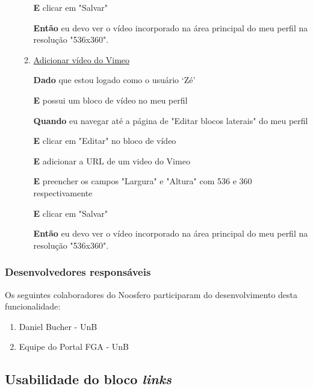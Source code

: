 \begin{enumerate}
\begin{enumerate}
\textbf{E} clicar em "Salvar"

\textbf{Então} eu devo ver o vídeo incorporado na área principal do meu
perfil na resolução "536x360".



\item \underline{Adicionar vídeo do Vimeo}

\textbf{Dado} que estou logado como o usuário `Zé'

\textbf{E} possui um bloco de vídeo no meu perfil

\textbf{Quando} eu navegar até a página de "Editar blocos laterais" do meu perfil

\textbf{E} clicar em "Editar" no bloco de vídeo

\textbf{E} adicionar a URL de um video do Vimeo

\textbf{E} preencher os campos "Largura" e "Altura" com 536 e 360
respectivamente

\textbf{E} clicar em "Salvar"

\textbf{Então} eu devo ver o vídeo incorporado na área principal do meu
perfil na resolução "536x360".

\end{enumerate}

\end{enumerate}

\subsubsection*{Desenvolvedores responsáveis}

Os seguintes colaboradores do Noosfero participaram do desenvolvimento desta
funcionalidade:

\begin{enumerate}

\item Daniel Bucher - UnB

\item Equipe do Portal FGA - UnB

\end{enumerate}
 
\subsection{Usabilidade do bloco \textit{links}}


